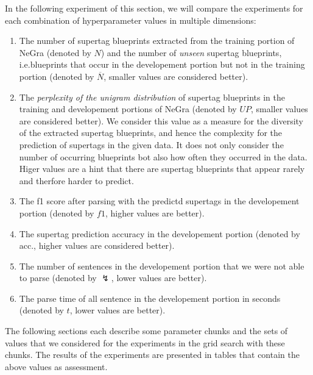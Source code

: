 \documentclass[../../document.tex]{subfiles}
\begin{document}
    In the following experiment of this section, we will compare the experiments for each combination of hyperparameter values in multiple dimensions:
    \begin{enumerate}
        \item The number of supertag blueprints extracted from the training portion of NeGra (denoted by \(N\)) and the number of \emph{unseen} supertag blueprints, i.e.\@ blueprints that occur in the developement portion but not in the training portion (denoted by \(\overline{N}\), smaller values are considered better).
        \item The \emph{perplexity of the unigram distribution} of supertag blueprints in the training and developement portions of NeGra (denoted by \(\mathit{UP}\), smaller values are considered better). We consider this value as a measure for the diversity of the extracted supertag blueprints, and hence the complexity for the prediction of supertags in the given data. It does not only consider the number of occurring blueprints bot also how often they occurred in the data. Higer values are a hint that there are supertag blueprints that appear rarely and therfore harder to predict.
        \item The f1 score after parsing with the predictd supertags in the developement portion (denoted by \(f1\), higher values are better).
        \item The supertag prediction accuracy in the developement portion (denoted by acc., higher values are considered better).
        \item The number of sentences in the developement portion that we were not able to parse (denoted by $\lightning$, lower values are better).
        \item The parse time of all sentence in the developement portion in seconds (denoted by \(t\), lower values are better).
    \end{enumerate}
    
    The following sections each describe some parameter chunks and the sets of values that we considered for the experiments in the grid search with these chunks.
    The results of the experiments are presented in tables that contain the above values as assessment.
    
\end{document}
